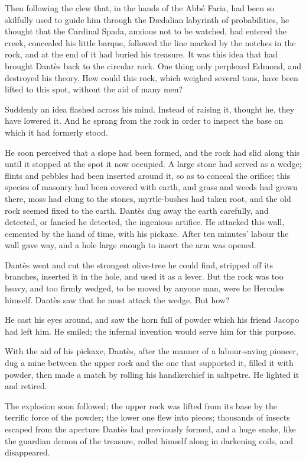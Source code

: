  Then following the clew that, in the hands of the Abbé Faria, had been so skilfully used to guide him through the Dædalian labyrinth of probabilities, he thought that the Cardinal Spada, anxious not to be watched, had entered the creek, concealed his little barque, followed the line marked by the notches in the rock, and at the end of it had buried his treasure. It was this idea that had brought Dantès back to the circular rock. One thing only perplexed Edmond, and destroyed his theory. How could this rock, which weighed several tons, have been lifted to this spot, without the aid of many men? 

 Suddenly an idea flashed across his mind. Instead of raising it, thought he, they have lowered it. And he sprang from the rock in order to inspect the base on which it had formerly stood. 

 He soon perceived that a slope had been formed, and the rock had slid along this until it stopped at the spot it now occupied. A large stone had served as a wedge; flints and pebbles had been inserted around it, so as to conceal the orifice; this species of masonry had been covered with earth, and grass and weeds had grown there, moss had clung to the stones, myrtle-bushes had taken root, and the old rock seemed fixed to the earth.  Dantès dug away the earth carefully, and detected, or fancied he detected, the ingenious artifice. He attacked this wall, cemented by the hand of time, with his pickaxe. After ten minutes' labour the wall gave way, and a hole large enough to insert the arm was opened. 

 Dantès went and cut the strongest olive-tree he could find, stripped off its branches, inserted it in the hole, and used it as a lever. But the rock was too heavy, and too firmly wedged, to be moved by anyone man, were he Hercules himself. Dantès saw that he must attack the wedge. But how? 

 He cast his eyes around, and saw the horn full of powder which his friend Jacopo had left him. He smiled; the infernal invention would serve him for this purpose. 

 With the aid of his pickaxe, Dantès, after the manner of a labour-saving pioneer, dug a mine between the upper rock and the one that supported it, filled it with powder, then made a match by rolling his handkerchief in saltpetre. He lighted it and retired. 

 The explosion soon followed; the upper rock was lifted from its base by the terrific force of the powder; the lower one flew into pieces; thousands of insects escaped from the aperture Dantès had previously formed, and a huge snake, like the guardian demon of the treasure, rolled himself along in darkening coils, and disappeared. 

